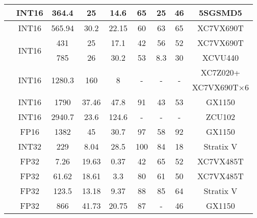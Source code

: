 \begin{table}[htbp]
\begin{tabular}{|r|c|c|c|c|c|c|c|c|}
            \cite{guan2017fp}           & INT16     & 364.4     & 25    & 14.6  & 65    & 25    & 46    & 5SGSMD5 \\ \hline
            \cite{li2016high}           & INT16     & 565.94    & 30.2  & 22.15 & 60    & 63    & 65    & XC7VX690T \\ \hline
            \multirow{2}[2]{*}{\cite{Shen2018Towards}} & \multirow{2}[2]{*}{INT16} & 431  & 25 & 17.1  & 42 & 56 & 52    & XC7VX690T \\ \cline{3-9}    
             &  & 785 & 26 & 30.2 & 53 & 8.3  & 30 & XCVU440 \\ \hline
            \multirow{2}[2]{*}{\cite{zhang2016energy}} & \multirow{2}[0]{*}{INT16} & \multirow{2}[0]{*}{1280.3} & \multirow{2}[0]{*}{160} & \multirow{2}[0]{*}{8} & \multirow{2}[0]{*}{-} & \multirow{2}[0]{*}{-} & \multirow{2}[0]{*}{-} & XC7Z020+ \\
            &       &       &       &       &       &       &       & XC7VX690T$\times$6 \\ \hline
            \cite{zhang2017improving}   & INT16     & 1790      & 37.46 & 47.8  & 91    & 43    & 53    & GX1150 \\ \hline
            \cite{lu2017evaluating}     & INT16     & 2940.7    & 23.6  & 124.6 &   -   &   -   &   -   & ZCU102 \\ \hline
            \cite{aydonat2017opencl}    & FP16      & 1382      & 45    & 30.7  & 97    & 58    & 92    & GX1150 \\ \hline
            \cite{podili2017fast}       & INT32     & 229       & 8.04  & 28.5  & 100   & 84    & 18    & Stratix V \\ \hline            
            \cite{guan2017fpga}         & FP32      & 7.26      & 19.63 & 0.37  & 42    & 65    & 52    & XC7VX485T \\ \hline
            \cite{zhang2015optimizing}  & FP32      & 61.62     & 18.61 & 3.3   & 80    & 61    & 50    & XC7VX485T \\ \hline
            \cite{zhang2017frequency}   & FP32      & 123.5     & 13.18 & 9.37  & 88    & 85    & 64    & Stratix V \\ \hline
            \cite{zhang2017improving}   & FP32      & 866       & 41.73 & 20.75 & 87    & -     & 46    & GX1150 \\ \hline
        \end{tabular}%
    \label{tab:hardware_list}%
  \end{table}%